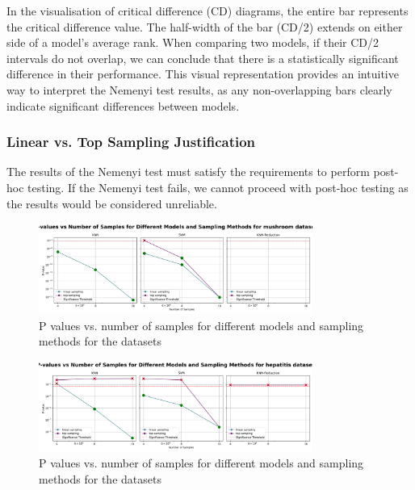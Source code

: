 In the visualisation of critical difference (CD) diagrams, the entire bar represents the critical difference value.
The half-width of the bar (CD/2) extends on either side of a model's average rank. When comparing two models,
if their CD/2 intervals do not overlap, we can conclude that there is a statistically significant difference in their performance.
This visual representation provides an intuitive way to interpret the Nemenyi test results, as any
non-overlapping bars clearly indicate significant differences between models.

\subsubsection{Linear vs. Top Sampling Justification}
The results of the Nemenyi test must satisfy the requirements to perform post-hoc testing.
If the Nemenyi test fails, we cannot proceed with post-hoc testing as the results would be considered unreliable.

\begin{figure}[!ht]
    \centering
    \includegraphics[width=0.8\textwidth]{figures/p_values_vs_num_samples_mushroom.png}
    \caption{P values vs. number of samples for different models and sampling methods for the datasets}
\label{fig:p_values_vs_num_samples_mushroom}
\end{figure}

\begin{figure}[!ht]
    \centering
    \includegraphics[width=0.8\textwidth]{figures/p_values_vs_num_samples_hepatitis.png}
    \caption{P values vs. number of samples for different models and sampling methods for the datasets}
\label{fig:p_values_vs_num_samples_hepatitis}
\end{figure}

